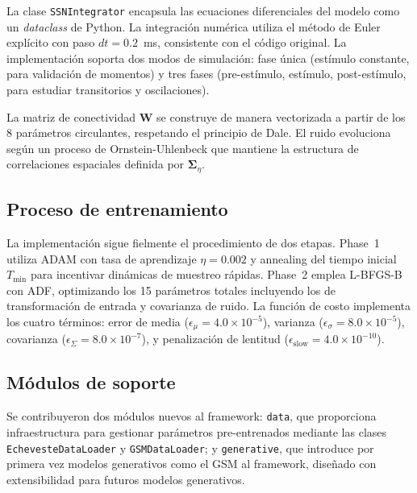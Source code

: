 \documentclass[spanish,a4paper,11pt]{article}
\begin{document}
La clase \texttt{SSNIntegrator} encapsula las ecuaciones diferenciales del modelo como un \textit{dataclass} de Python. La integración numérica utiliza el método de Euler explícito con paso $dt = 0.2$~ms, consistente con el código original. La implementación soporta dos modos de simulación: fase única (estímulo constante, para validación de momentos) y tres fases (pre-estímulo, estímulo, post-estímulo, para estudiar transitorios y oscilaciones).

La matriz de conectividad $\mathbf{W}$ se construye de manera vectorizada a partir de los 8 parámetros circulantes, respetando el principio de Dale. El ruido evoluciona según un proceso de Ornstein-Uhlenbeck que mantiene la estructura de correlaciones espaciales definida por $\boldsymbol{\Sigma}_\eta$.

\subsection{Proceso de entrenamiento}

La implementación sigue fielmente el procedimiento de dos etapas. Phase~1 utiliza ADAM con tasa de aprendizaje $\eta = 0.002$ y annealing del tiempo inicial $T_{\min}$ para incentivar dinámicas de muestreo rápidas. Phase~2 emplea L-BFGS-B con ADF, optimizando los 15 parámetros totales incluyendo los de transformación de entrada y covarianza de ruido. La función de costo implementa los cuatro términos: error de media ($\epsilon_\mu = 4.0 \times 10^{-5}$), varianza ($\epsilon_\sigma = 8.0 \times 10^{-5}$), covarianza ($\epsilon_\Sigma = 8.0 \times 10^{-7}$), y penalización de lentitud ($\epsilon_{\text{slow}} = 4.0 \times 10^{-10}$).

\subsection{Módulos de soporte}

Se contribuyeron dos módulos nuevos al framework: \texttt{data}, que proporciona infraestructura para gestionar parámetros pre-entrenados mediante las clases \texttt{EchevesteDataLoader} y \texttt{GSMDataLoader}; y \texttt{generative}, que introduce por primera vez modelos generativos como el GSM al framework, diseñado con extensibilidad para futuros modelos generativos.

\end{document}
